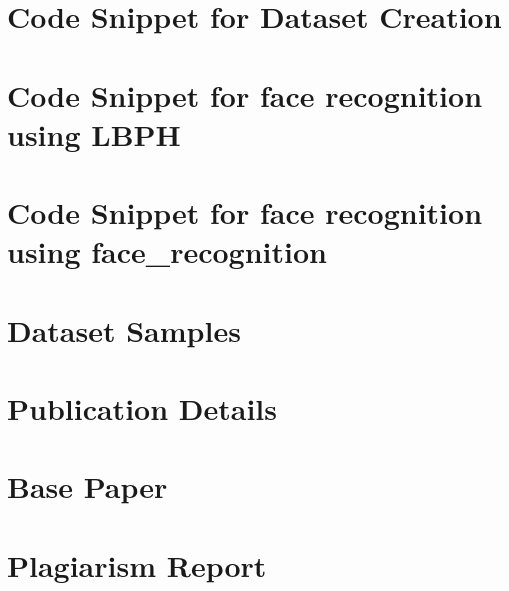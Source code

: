 \documentclass[openany]{report}
\begin{document}
\chapter{Code Snippet for Dataset Creation}

\chapter{Code Snippet for face recognition using LBPH}

\chapter{Code Snippet for face recognition using face\_recognition}

\chapter{Dataset Samples}

\chapter{Publication Details}

\chapter{Base Paper}

\chapter{Plagiarism Report}
\end{document}

